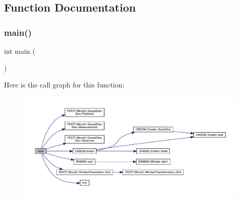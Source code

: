 \subsection{Function Documentation}
\mbox{\label{adat-devel_2other__libs_2minuit_2test_2MnSim_2DemoFumili_8cxx_ae66f6b31b5ad750f1fe042a706a4e3d4}} 
\subsubsection{\texorpdfstring{main()}{main()}}
{\footnotesize\ttfamily int main (\begin{DoxyParamCaption}{ }\end{DoxyParamCaption})}

Here is the call graph for this function\+:
\nopagebreak
\begin{figure}[H]
\begin{center}
\leavevmode
\includegraphics[width=350pt]{d2/db8/adat-devel_2other__libs_2minuit_2test_2MnSim_2DemoFumili_8cxx_ae66f6b31b5ad750f1fe042a706a4e3d4_cgraph}
\end{center}
\end{figure}
